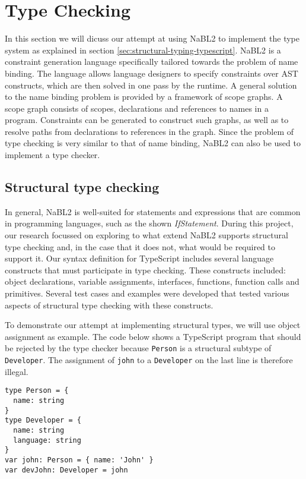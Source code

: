 \newpage
\section{Type Checking}
\label{sec:type-checking}

In this section we will dicuss our attempt at using NaBL2 \citep{Antwerpen:2016:CLS:2847538.2847543} to implement the type system as explained in section \ref{sec:structural-typing-typescript}.
NaBL2 is a constraint generation language specifically tailored towards the problem of name binding.
The language allows language designers to specify constraints over AST constructs, which are then solved in one pass by the runtime.
A general solution to the name binding problem is provided by a framework of scope graphs.
A scope graph consists of scopes, declarations and references to names in a program.
Constraints can be generated to construct such graphs, as well as to resolve paths from declarations to references in the graph.
Since the problem of type checking is very similar to that of name binding, NaBL2 can also be used to implement a type checker.

\subsection{Structural type checking}

In general, NaBL2 is well-suited for statements and expressions that are common in programming languages, 
such as the shown \textit{IfStatement}.
During this project, our research focussed on exploring to what extend NaBL2 supports structural type checking and, 
in the case that it does not, what would be required to support it.
Our syntax definition for TypeScript includes several language constructs that must participate in type checking.
These constructs included: object declarations, variable assignments, interfaces, functions, function calls and primitives.
Several test cases and examples were developed that tested various aspects of structural type checking with these constructs.

To demonstrate our attempt at implementing structural types, we will use object assignment as example.
The code below shows a TypeScript program that should be rejected by the type checker 
because \texttt{Person} is a structural subtype of \texttt{Developer}. 
The assignment of \texttt{john} to a \texttt{Developer} on the last line is therefore illegal.
\begin{lstlisting}
type Person = {
  name: string
}
type Developer = {
  name: string
  language: string
}
var john: Person = { name: 'John' }
var devJohn: Developer = john
\end{lstlisting}

